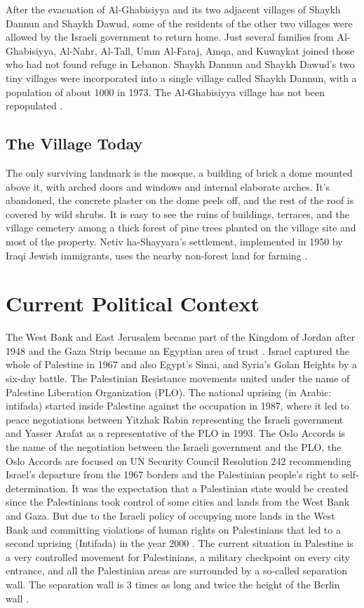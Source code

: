 After the evacuation of Al-Ghabisiyya and its two adjacent villages of Shaykh Dannun and Shaykh Dawud, some of the residents of the other two villages were allowed by the Israeli government to return home. Just several families from Al-Ghabisiyya, Al-Nahr, Al-Tall, Umm Al-Faraj, Amqa, and Kuwaykat joined those who had not found refuge in Lebanon. Shaykh Dannun and Shaykh Dawud's two tiny villages were incorporated into a single village called Shaykh Dannun, with a population of about 1000 in 1973. The Al-Ghabisiyya village has not been repopulated \citep{Khalidi2015}.  

\subsection{The Village Today}

The only surviving landmark is the mosque, a building of brick a dome mounted above it, with arched doors and windows and internal elaborate arches. It's abandoned, the concrete plaster on the dome peels off, and the rest of the roof is covered by wild shrubs. It is easy to see the ruins of buildings, terraces, and the village cemetery among a thick forest of pine trees planted on the village site and most of the property. Netiv ha-Shayyara's settlement, implemented in 1950 by Iraqi Jewish immigrants, uses the nearby non-forest land for farming \citep{Khalidi2015}.    
\section{Current Political Context}

The West Bank and East Jerusalem became part of the Kingdom of Jordan after 1948 and the Gaza Strip became an Egyptian area of trust \citep{Houdaille2010}. Israel captured the whole of Palestine in 1967 and also Egypt's Sinai, and Syria's Golan Heights by a six-day battle. The Palestinian Resistance movements united under the name of Palestine Liberation Organization (PLO). The national uprising (in Arabic: intifada) started inside Palestine against the occupation in 1987, where it led to peace negotiations between Yitzhak Rabin representing the Israeli government and Yasser Arafat as a representative of the PLO in 1993. The Oslo Accords is the name of the negotiation between the Israeli government and the PLO, the Oslo Accords are focused on UN Security Council Resolution 242 recommending Israel's departure from the 1967 borders and the Palestinian people's right to self-determination. It was the expectation that a Palestinian state would be created since the Palestinians took control of some cities and lands from the West Bank and Gaza. But due to the Israeli policy of occupying more lands in the West Bank and committing violations of human rights on Palestinians that led to a second uprising (Intifada) in the year 2000 \citep{Shalhoub-Kevorkian2006}. The current situation in Palestine is a very controlled movement for Palestinians, a military checkpoint on every city entrance, and all the Palestinian areas are surrounded by a so-called separation wall. The separation wall is 3 times as long and twice the height of the Berlin wall \citep{Shalhoub-Kevorkian2006}.



